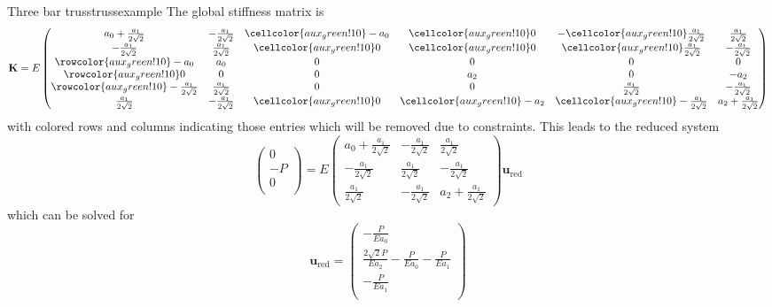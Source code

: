 \begin{example}{Three bar truss}{trussexample}
    The global stiffness matrix is 
    \begin{equation}
        \mathbf{K} = E
        \begin{pmatrix}
             a_0 + \frac{a_1}{2\sqrt{2}}&  -\frac{a_1}{2\sqrt{2}} & \cellcolor{aux_green!10}-a_0 &  \cellcolor{aux_green!10}0 & -\cellcolor{aux_green!10} \frac{a_1}{2\sqrt{2}} &  \frac{a_1}{2\sqrt{2}}\\
            -\frac{a_1}{2\sqrt{2}} &  \frac{a_1}{2\sqrt{2}} & \cellcolor{aux_green!10} 0 & \cellcolor{aux_green!10} 0 & \cellcolor{aux_green!10}\frac{a_1}{2\sqrt{2}} &  -\frac{a_1}{2\sqrt{2}} \\
            \rowcolor{aux_green!10}
             -a_0 &  a_0 & 0 &  0 & 0 & 0\\
             \rowcolor{aux_green!10}
            0 &  0 & 0 &  a_2 & 0 &  -a_2 \\
            \rowcolor{aux_green!10}
             -\frac{a_1}{2\sqrt{2}} &  \frac{a_1}{2\sqrt{2}} & 0 &  0 & \frac{a_1}{2\sqrt{2}} &  -\frac{a_1}{2\sqrt{2}}\\
            \frac{a_1}{2\sqrt{2}} &  -\frac{a_1}{2\sqrt{2}} & \cellcolor{aux_green!10} 0 &  \cellcolor{aux_green!10} -a_2 & \cellcolor{aux_green!10} -\frac{a_1}{2\sqrt{2}} &  a_2 + \frac{a_1}{2\sqrt{2}}\\
        \end{pmatrix}
    \end{equation}
    with colored rows and columns indicating those entries which will be removed due to constraints. This leads to the reduced system 
    \begin{equation}
        \begin{pmatrix}
            0 \\ -P \\ 0  \\
        \end{pmatrix}
         = E
        \begin{pmatrix}
             a_0 + \frac{a_1}{2\sqrt{2}}&  -\frac{a_1}{2\sqrt{2}} &  \frac{a_1}{2\sqrt{2}}\\
            -\frac{a_1}{2\sqrt{2}} &  \frac{a_1}{2\sqrt{2}} &  -\frac{a_1}{2\sqrt{2}} \\
            \frac{a_1}{2\sqrt{2}} &  -\frac{a_1}{2\sqrt{2}} &  a_2 + \frac{a_1}{2\sqrt{2}}
        \end{pmatrix}
        \mathbf{u}_\textrm{red}
    \end{equation}
    which can be solved for 
    \begin{equation}
        \mathbf{u}_\textrm{red} = 
        \begin{pmatrix}
            -\frac{P}{Ea_0} \\  \frac{2\sqrt{2}P}{Ea_2} - \frac{P}{Ea_0} - \frac{P}{Ea_1} \\ -\frac{P}{Ea_1}  \\
        \end{pmatrix}
    \end{equation}


\end{example}
